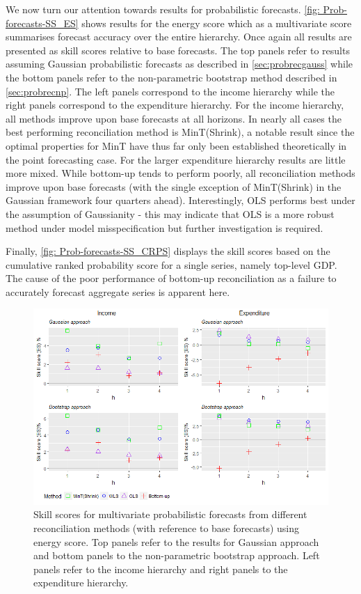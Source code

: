 \documentclass[graybox]{svmult}
\begin{document}
We now turn our attention towards results for probabilistic forecasts. \autoref{fig: Prob-forecasts-SS_ES} shows results for the energy score which as a multivariate score summarises forecast accuracy over the entire hierarchy. Once again all results are presented as skill scores relative to base forecasts. The top panels refer to results assuming Gaussian probabilistic forecasts as described in \autoref{sec:probrecgauss} while the bottom panels refer to the non-parametric bootstrap method described in \autoref{sec:probrecnp}. The left panels correspond to the income hierarchy while the right panels correspond to the expenditure hierarchy. For the income hierarchy, all methods improve upon base forecasts at all horizons. In nearly all cases the best performing reconciliation method is MinT(Shrink), a notable result since the optimal properties for MinT have thus far only been established theoretically in the point forecasting case. For the larger expenditure hierarchy results are little more mixed. While bottom-up tends to perform poorly, all reconciliation methods improve upon base forecasts (with the single exception of MinT(Shrink) in the Gaussian framework four quarters ahead). Interestingly, OLS performs best under the assumption of Gaussianity - this may indicate that OLS is a more robust method under model misspecification but further investigation is required.

Finally, \autoref{fig: Prob-forecasts-SS_CRPS} displays the skill scores based on the cumulative ranked probability score for a single series, namely top-level GDP. The cause of the poor performance of bottom-up reconciliation as a failure to accurately forecast aggregate series is apparent here.

\begin{figure}
	\centering
	\small
	\includegraphics[width=\textwidth]{Figs/Results/ProbF_MultivS.png}
	\caption{Skill scores for multivariate probabilistic forecasts from different reconciliation methods (with reference to base forecasts) using energy score. Top panels refer to the results for Gaussian approach and bottom panels to the non-parametric bootstrap approach. Left panels refer to the income hierarchy and right panels to the expenditure hierarchy.}
	\label{fig: Prob-forecasts-SS_ES}
\end{figure}
\end{document}
